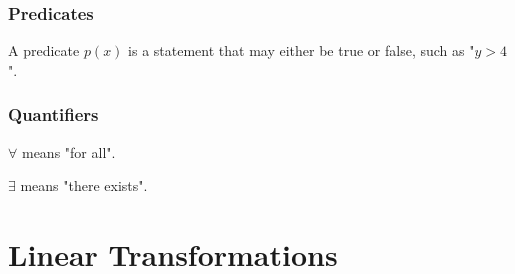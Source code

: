 \subsubsection*{Predicates}
\par\noindent A predicate $p(x)$ is a statement that may either be true or false, such as "$y>4$".
\subsubsection*{Quantifiers}
\par\noindent $\forall$ means "for all".
\par\noindent $\exists$ means "there exists".

\section{Linear Transformations}


